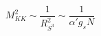 \begin{equation}
\label{kk}
M_{KK}^2 \sim \frac{1}{R^2_{S^3}} \sim \frac{1}{\alpha' g_s N}
\end{equation}

